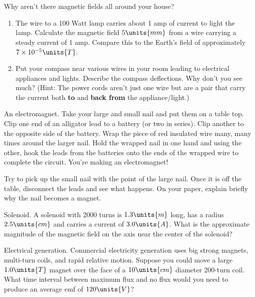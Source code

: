 \begin{aproblem}{Why aren't there magnetic fields all around your
house?}
  \begin{enumerate}
  \item The wire to a 100 Watt lamp carries about 1 amp of current to
    light the lamp. Calculate the magnetic field $5\units{mm}$ from a
    wire carrying a steady current of 1 amp.  Compare this to the
    Earth's field of approximately $7 \times 10^{-5}\units{T}$.
  \item Put your compass near various wires in your room leading to
    electrical appliances and lights.  Describe the compass
    deflections.  Why don't you see much?  (Hint: The power cords
    aren't just one wire but are a pair that carry the current both
    {\bf to} and {\bf back from} the appliance/light.)
    \label{prob:PowerCords}
  \end{enumerate}
\end{aproblem}

\begin{aproblem}{An electromagnet.}  
  Take your large and small nail and put them on a table top. Clip one
  end of an alligator lead to a battery (or two in series). Clip
  another to the opposite side of the battery. Wrap the piece of red
  insulated wire many, many times around the larger nail. Hold the
  wrapped nail in one hand and using the other, hook the leads from
  the batteries onto the ends of the wrapped wire to complete the
  circuit.  You're making an electromagnet!

  Try to pick up the small nail with the point of the large nail.
  Once it is off the table, disconnect the leads and see what happens.
  On your paper, explain briefly why the nail becomes a magnet.
\end{aproblem}

\begin{aproblem}{Solenoid.}  
  A solenoid with 2000 turns is $1.3\units{m}$ long, has a radius
  $2.5\units{cm}$ and carries a current of $3.0\units{A}$.  What is
  the approximate magnitude of the magnetic field on the axis near the
  center of the solenoid?
  \label{prob:solenoid}
\end{aproblem}


\begin{aproblem}{Electrical generation.}  
  Commercial electricity generation uses big strong magnets,
  multi-turn coils, and rapid relative motion.  Suppose you could move
  a large $1.0\units{T}$ magnet over the face of a $10\units{cm}$
  diameter 200-turn coil.  What time interval between maximum flux and
  no flux would you need to produce an average emf of $120\units{V}$?
  \label{prob:ElecGen}
\end{aproblem}


